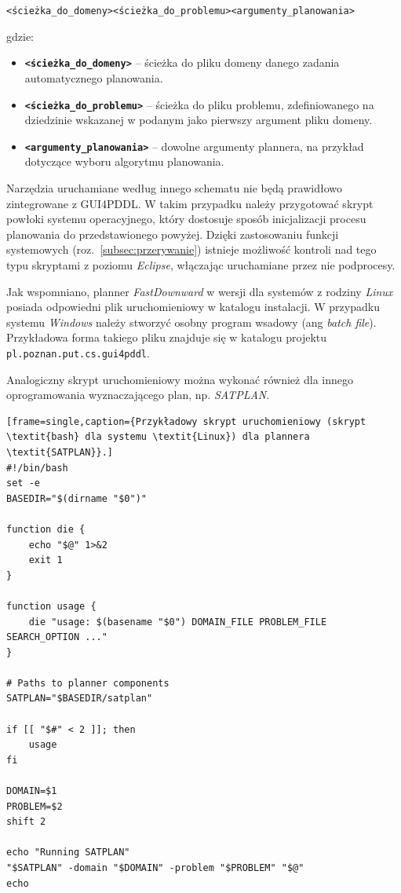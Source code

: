 \noindent
\centerline{\texttt{<ścieżka\_do\_domeny>}\textvisiblespace\texttt{<ścieżka\_do\_problemu>}\textvisiblespace\texttt{<argumenty\_planowania>}}


\noindent
gdzie:
\begin{itemize}
\item \textbf{\texttt{<ścieżka\_do\_domeny>}} -- ścieżka do pliku domeny danego zadania automatycznego planowania.
\item \textbf{\texttt{<ścieżka\_do\_problemu>}} -- ścieżka do pliku problemu, zdefiniowanego na dziedzinie wskazanej w podanym jako pierwszy argument pliku domeny.
\item \textbf{\texttt{<argumenty\_planowania>}} -- dowolne argumenty plannera, na przykład dotyczące wyboru algorytmu planowania.
\end{itemize}
Narzędzia uruchamiane według innego schematu nie będą prawidłowo zintegrowane z GUI4PDDL. W takim przypadku należy przygotować skrypt powłoki systemu operacyjnego, który dostosuje sposób inicjalizacji procesu planowania do przedstawionego powyżej. Dzięki zastosowaniu funkcji systemowych (roz.~\ref{subsec:przerywanie}) istnieje możliwość kontroli nad tego typu skryptami z poziomu \textit{Eclipse}, włączając uruchamiane przez nie podprocesy.

Jak wspomniano, planner \textit{FastDownward} w wersji dla systemów z rodziny \textit{Linux} posiada odpowiedni plik uruchomieniowy w katalogu  instalacji. W przypadku systemu \textit{Windows} należy stworzyć osobny program wsadowy (ang \textit{batch file}). Przykładowa forma takiego pliku znajduje się w katalogu  projektu \texttt{pl.poznan.put.cs.gui4pddl}.

Analogiczny skrypt uruchomieniowy można wykonać również dla innego oprogramowania wyznaczającego plan, np. \textit{SATPLAN}.

\lstset{language=bash}          %
\begin{lstlisting}[frame=single,caption={Przykładowy skrypt uruchomieniowy (skrypt \textit{bash} dla systemu \textit{Linux}) dla plannera \textit{SATPLAN}}.]
#!/bin/bash
set -e
BASEDIR="$(dirname "$0")"

function die {
    echo "$@" 1>&2
    exit 1
}

function usage {
    die "usage: $(basename "$0") DOMAIN_FILE PROBLEM_FILE SEARCH_OPTION ..."
}

# Paths to planner components
SATPLAN="$BASEDIR/satplan"

if [[ "$#" < 2 ]]; then
    usage
fi

DOMAIN=$1
PROBLEM=$2
shift 2

echo "Running SATPLAN"
"$SATPLAN" -domain "$DOMAIN" -problem "$PROBLEM" "$@"
echo
\end{lstlisting}

